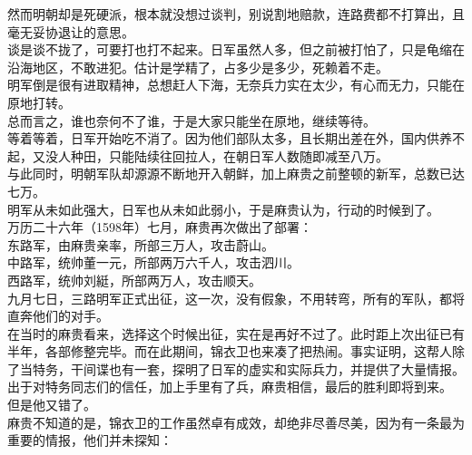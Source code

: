 \begin{multicols}{\theparacolNo}
然而明朝却是死硬派，根本就没想过谈判，别说割地赔款，连路费都不打算出，且毫无妥协退让的意思。\\

谈是谈不拢了，可要打也打不起来。日军虽然人多，但之前被打怕了，只是龟缩在沿海地区，不敢进犯。估计是学精了，占多少是多少，死赖着不走。\\

明军倒是很有进取精神，总想赶人下海，无奈兵力实在太少，有心而无力，只能在原地打转。\\

总而言之，谁也奈何不了谁，于是大家只能坐在原地，继续等待。\\

等着等着，日军开始吃不消了。因为他们部队太多，且长期出差在外，国内供养不起，又没人种田，只能陆续往回拉人，在朝日军人数随即减至八万。\\

与此同时，明朝军队却源源不断地开入朝鲜，加上麻贵之前整顿的新军，总数已达七万。\\

明军从未如此强大，日军也从未如此弱小，于是麻贵认为，行动的时候到了。\\

万历二十六年（1598年）七月，麻贵再次做出了部署：\\

东路军，由麻贵亲率，所部三万人，攻击蔚山。\\

中路军，统帅董一元，所部两万六千人，攻击泗川。\\

西路军，统帅刘綎，所部两万人，攻击顺天。\\

九月七日，三路明军正式出征，这一次，没有假象，不用转弯，所有的军队，都将直奔他们的对手。\\

在当时的麻贵看来，选择这个时候出征，实在是再好不过了。此时距上次出征已有半年，各部修整完毕。而在此期间，锦衣卫也来凑了把热闹。事实证明，这帮人除了当特务，干间谍也有一套，探明了日军的虚实和实际兵力，并提供了大量情报。\\

出于对特务同志们的信任，加上手里有了兵，麻贵相信，最后的胜利即将到来。\\

但是他又错了。\\

麻贵不知道的是，锦衣卫的工作虽然卓有成效，却绝非尽善尽美，因为有一条最为重要的情报，他们并未探知：\\


\end{multicols}
